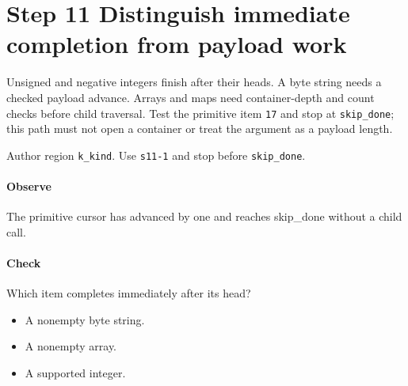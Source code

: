 \section{Step 11 Distinguish immediate completion from payload work}\label{cbor-s11}
Unsigned and negative integers finish after their heads. A byte string needs a checked payload advance. Arrays and maps need container-depth and count checks before child traversal. Test the primitive item \texttt{17} and stop at \texttt{skip\_done}; this path must not open a container or treat the argument as a payload length.

Author region \texttt{k\_kind}. Use \texttt{s11-1} and stop before \texttt{skip\_done}.

\paragraph{Observe} The primitive cursor has advanced by one and reaches skip\_done without a child call.

\paragraph{Check} Which item completes immediately after its head?
\begin{itemize}
  \item[A.] A nonempty byte string.
  \item[B.] A nonempty array.
  \item[C.] A supported integer.
\end{itemize}
